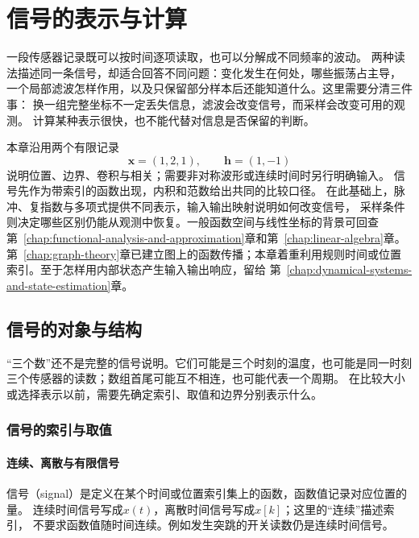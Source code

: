 \chapter{信号的表示与计算}
\label{chap:signal-analysis}

一段传感器记录既可以按时间逐项读取，也可以分解成不同频率的波动。
两种读法描述同一条信号，却适合回答不同问题：变化发生在何处，哪些振荡占主导，
一个局部滤波怎样作用，以及只保留部分样本后还能知道什么。这里需要分清三件事：
换一组完整坐标不一定丢失信息，滤波会改变信号，而采样会改变可用的观测。
计算某种表示很快，也不能代替对信息是否保留的判断。

本章沿用两个有限记录
\begin{equation}
  \bm x=(1,2,1),\qquad \bm h=(1,-1)
  \label{eq:signal-analysis-running-example}
\end{equation}
说明位置、边界、卷积与相关；需要非对称波形或连续时间时另行明确输入。
信号先作为带索引的函数出现，内积和范数给出共同的比较口径。
在此基础上，脉冲、复指数与多项式提供不同表示，输入输出映射说明如何改变信号，
采样条件则决定哪些区别仍能从观测中恢复。一般函数空间与线性坐标的背景可回查
第~\ref{chap:functional-analysis-and-approximation}章和第~\ref{chap:linear-algebra}章。
第~\ref{chap:graph-theory}章已建立图上的函数传播；本章着重利用规则时间或位置
索引。至于怎样用内部状态产生输入输出响应，留给
第~\ref{chap:dynamical-systems-and-state-estimation}章。

\section{信号的对象与结构}
\label{sec:signal-objects-structure}

“三个数”还不是完整的信号说明。它们可能是三个时刻的温度，也可能是同一时刻
三个传感器的读数；数组首尾可能互不相连，也可能代表一个周期。
在比较大小或选择表示以前，需要先确定索引、取值和边界分别表示什么。

\subsection{信号的索引与取值}

\subsubsection{连续、离散与有限信号}

信号（signal）是定义在某个时间或位置索引集上的函数，函数值记录对应位置的量。
连续时间信号写成$x(t)$，离散时间信号写成$x[k]$；这里的“连续”描述索引，
不要求函数值随时间连续。例如发生突跳的开关读数仍是连续时间信号。

